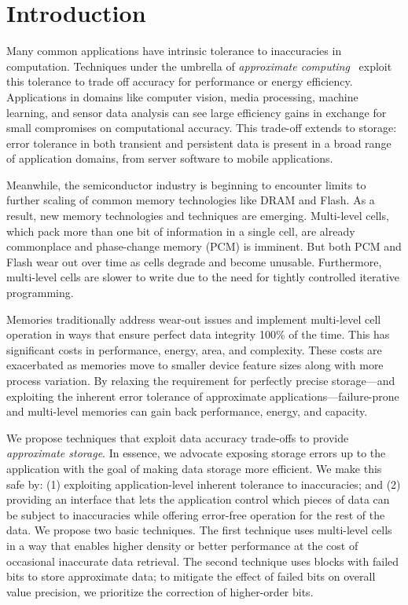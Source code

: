 

\section{Introduction}
\label{approxstorage:sec:intro}

Many common applications have intrinsic tolerance to inaccuracies in
computation. Techniques under the umbrella of {\em approximate
computing}~\cite{enerj,truffle,pcmos,green,stochasticproc,relax,perforation,flikker,ersa} exploit this tolerance
to trade off accuracy for performance or energy efficiency. Applications
in domains like computer vision, media processing, machine learning, and
sensor data analysis can see large efficiency gains in exchange for
small compromises on computational accuracy. This trade-off extends to
storage: error tolerance in both transient and persistent data is
present in a broad range of application domains, from server software to
mobile applications.

Meanwhile, the semiconductor industry is beginning to encounter limits to
further scaling of common memory technologies like DRAM and Flash. As a
result, new memory technologies and techniques are emerging. Multi-level cells,
which pack more than one bit of information in a single cell,
are already commonplace and phase-change memory (PCM) is imminent.
But both
PCM and Flash wear out over time as cells degrade and become unusable. Furthermore, multi-level cells
are slower to write due to the need for tightly
controlled iterative programming.

Memories traditionally address wear-out issues and implement multi-level cell
operation in ways that ensure perfect data integrity 100\% of the time. This
has significant costs in performance, energy, area, and complexity. These
costs are exacerbated as memories move to smaller device feature sizes along
with more process variation. By relaxing the requirement for perfectly precise
storage---and exploiting the inherent error tolerance of approximate
applications---failure-prone and multi-level memories can gain back
performance, energy, and capacity.

We propose techniques that exploit data accuracy trade-offs to
provide \emph{approximate storage}. In essence, we advocate exposing storage
errors up to the application with the goal of making data storage more
efficient. We make this safe by: (1) exploiting application-level inherent
tolerance to inaccuracies; and (2) providing an interface that lets the
application control which pieces of data can be subject to inaccuracies while offering error-free operation for the rest of the data.
We propose two basic techniques. The first
technique uses multi-level cells in a way that enables higher density or
better performance at the cost of occasional inaccurate data retrieval. The
second technique uses blocks with failed bits to store approximate data; to
mitigate the effect of failed bits on overall value precision, we prioritize
the correction of higher-order bits.


